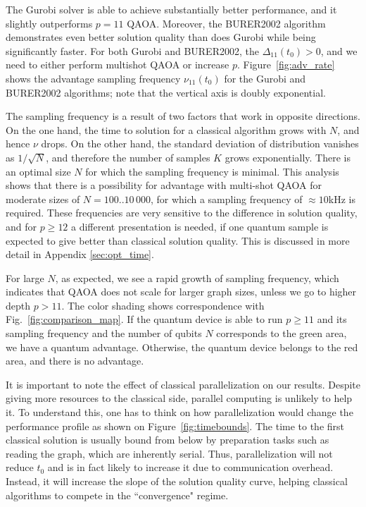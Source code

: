 The Gurobi solver is able to achieve substantially better performance, and it slightly outperforms $p=11$ QAOA. Moreover, the BURER2002 algorithm demonstrates even better solution quality than does  Gurobi while being significantly faster. For both Gurobi and BURER2002, the $\Delta_{11}(t_0) > 0$, and we need to either perform multishot QAOA or increase $p$. Figure~\ref{fig:adv_rate} shows the advantage sampling frequency $\nu_{11}(t_0)$ for the Gurobi and BURER2002 algorithms; note that the vertical axis is doubly exponential.

The sampling frequency is a result of two factors that work in opposite directions. On the one hand, the time to solution for a classical algorithm grows with $N$, and hence $\nu$ drops. On the other hand, the  standard deviation of distribution vanishes as $1/\sqrt{N}$, and therefore the number of samples $K$ grows exponentially. There is an optimal size $N$ for which the sampling frequency is minimal.
This analysis shows that there is a possibility for advantage with multi-shot QAOA for moderate sizes of $N=100..10\,000$, for which a sampling frequency of $\approx10$kHz is required.
These frequencies are very sensitive to the difference in solution quality, and for $p\geq12$ a different presentation is needed, if one quantum sample is expected to give better than classical solution quality. This is discussed in more detail in Appendix \ref{sec:opt_time}.

For large $N$, as expected, we see a rapid growth of sampling frequency, which indicates that QAOA does not scale for larger graph sizes, unless we go to higher depth $p>11$. The color shading shows correspondence with Fig.~\ref{fig:comparison_map}. If the quantum device is able to run $p \geq 11$ and its sampling frequency and the number of qubits $N$ corresponds to the green area, we have a quantum advantage. Otherwise, the quantum device belongs to the red area, and there is no advantage.

It is important to note the effect of classical parallelization on our results. Despite giving more resources to the classical side, parallel computing is unlikely to help it. To understand this, one has to think on how parallelization would change the performance profile as shown on Figure~\ref{fig:timebounds}. The time to the first classical solution is usually bound from below by preparation tasks such as reading the graph, which are inherently serial. Thus, parallelization will not reduce $t_0$ and is in fact likely to increase it due to communication overhead. Instead, it will increase the slope of the solution quality curve, helping classical algorithms to compete in the ``convergence" regime. 



